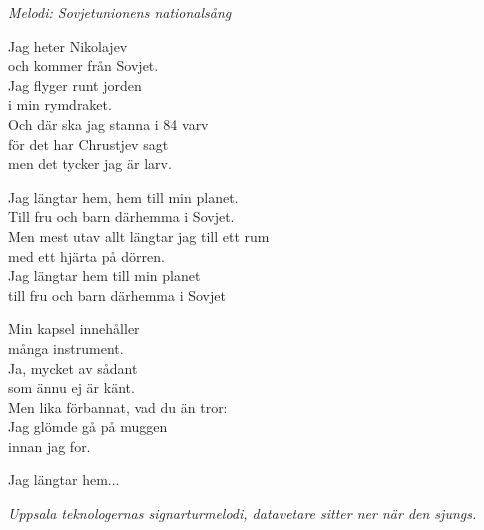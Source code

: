 {\footnotesize\textit{Melodi: Sovjetunionens nationalsång}}\par
\vspace{10pt}
Jag heter Nikolajev\\
och kommer från Sovjet.\\
Jag flyger runt jorden\\
i min rymdraket.\\
Och där ska jag stanna i 84 varv\\
för det har Chrustjev sagt\\
men det tycker jag är larv.\par
\vspace{10pt}
Jag längtar hem, hem till min planet.\\
Till fru och barn därhemma i Sovjet.\\
Men mest utav allt längtar jag till ett rum\\
med ett hjärta på dörren.\\
Jag längtar hem till min planet\\
till fru och barn därhemma i Sovjet\par
\vspace{10pt}
Min kapsel innehåller\\
många instrument.\\
Ja, mycket av sådant\\
som ännu ej är känt.\\
Men lika förbannat, vad du än tror:\\
Jag glömde gå på muggen\\
innan jag for.\par
\vspace{10pt}
Jag längtar hem...
\par
\vspace{10pt}
{\footnotesize\textit{Uppsala teknologernas signarturmelodi, datavetare sitter ner när den sjungs.}}
